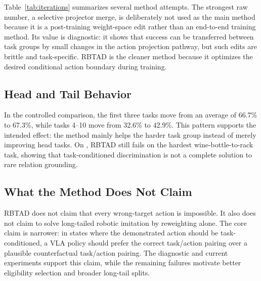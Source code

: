 Table~\ref{tab:iterations} summarizes several method attempts. The strongest raw number, a selective projector merge, is deliberately not used as the main method because it is a post-training weight-space edit rather than an end-to-end training method. Its value is diagnostic: it shows that success can be transferred between task groups by small changes in the action projection pathway, but such edits are brittle and task-specific. RBTAD is the cleaner method because it optimizes the desired conditional action boundary during training.

\subsection{Head and Tail Behavior}

In the \liberocorefull{} controlled comparison, the first three tasks move from an average of 66.7\% to 67.3\%, while tasks 4--10 move from 32.6\% to 42.9\%. This pattern supports the intended effect: the method mainly helps the harder task group instead of merely improving head tasks. On \liberocorelt{}, RBTAD still fails on the hardest wine-bottle-to-rack task, showing that task-conditioned discrimination is not a complete solution to rare relation grounding.

\subsection{What the Method Does Not Claim}

RBTAD does not claim that every wrong-target action is impossible. It also does not claim to solve long-tailed robotic imitation by reweighting alone. The core claim is narrower: in states where the demonstrated action should be task-conditioned, a VLA policy should prefer the correct task/action pairing over a plausible counterfactual task/action pairing. The diagnostic and current experiments support this claim, while the remaining failures motivate better eligibility selection and broader long-tail splits.
